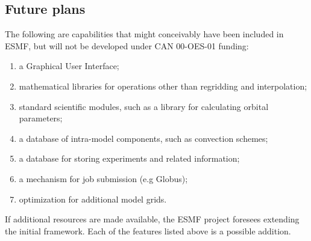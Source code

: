 \subsection{Future plans}

The following are capabilities that might conceivably have been
included in ESMF, but will not be developed under CAN 00-OES-01
funding:
\begin{enumerate}
\item a Graphical User Interface;
\item mathematical libraries for operations other than regridding and
  interpolation;
\item standard scientific modules, such as a library for calculating
  orbital parameters;
\item a database of intra-model components, such as convection schemes;
\item a database for storing experiments and related information;
\item a mechanism for job submission (e.g Globus);
\item optimization for additional model grids.
\end{enumerate}

If additional resources are made available, the ESMF project foresees
extending the initial framework.  Each of the features listed above is
a possible addition.




















